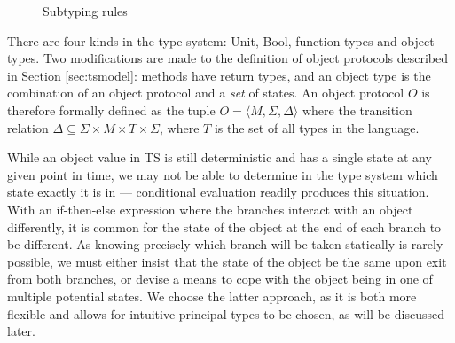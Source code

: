 \documentclass[preprint]{sigplanconf}
\newcommand{\secref}[1]{Section \ref{#1}}
\begin{document}
\begin{figure}

\ottdefnsubtype

\caption{\label{fig:subtyperules} Subtyping rules}
\end{figure}

There are four kinds in the type system: Unit, Bool, function types and 
object types.
Two modifications are made to the definition of object protocols described
in \secref{sec:tsmodel}: methods have return types, and an object type
is the combination of an object protocol and a {\it set} of states.
An object protocol $O$ is therefore formally defined as the tuple 
$O = \langle M, \Sigma, \Delta \rangle$
where the transition relation $\Delta \subseteq \Sigma \times M \times T \times \Sigma$, 
where $T$ is the set of all types in the language.

While an object value in TS is still deterministic and has a single state at any 
given
point in time, we may not be able to determine in the type system which state 
exactly it is in --- conditional evaluation readily produces this situation.
With an if-then-else expression where the branches
interact with an object differently, it is common for the state of the object
at the end of each branch to be different. As
knowing precisely which branch will be taken statically is rarely possible, 
we must either insist that the state of the object
be the same upon exit from both branches, or devise a means to cope with
the object being in one of multiple potential states. We choose the latter
approach, as it is both more flexible and allows for intuitive principal
types to be chosen, as will be discussed later.




\end{document}
